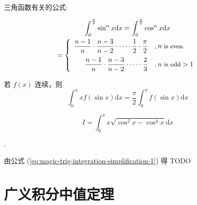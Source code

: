 三角函数有关的公式:
\begin{lemma}[点火公式]
    \begin{multline}\label{eq:launching-formula}
        \int_0^{\frac{\pi}{2}} \sin ^n x \mathrm{d} x = \int_0^{\frac{\pi}{2}} \cos ^n x \mathrm{d} x \\
        = 
        \left\{ 
            \begin{array}{rl}
                \dfrac{n - 1}{n} \cdot \dfrac{n - 3}{n - 2} \cdot \cdots \cdot \dfrac{1}{2} \cdot \dfrac{\pi}{2} &, n \mbox{\small \ is even.}   \\[1em]
                \dfrac{n - 1}{n} \cdot \dfrac{n - 3}{n - 2} \cdot \cdots \cdot \dfrac{2}{3}                      &, n \mbox{\small \ is odd} > 1 \\
            \end{array}
        \right.
    \end{multline}
    
    若 $f(x)$ 连续，则
    \begin{equation}
        \label{eq:magic-trig-integration-simplification-1}
        \int_0^{\pi} x f(\sin x) \mathrm{d} x = \dfrac{\pi}{2} \int_0^{\pi} f(\sin x) \mathrm{d} x
    \end{equation}
\end{lemma}

\begin{example}
    \[
        I = \int_0^{\pi} x \sqrt{\cos^2 x - \cos^4 x} \mathrm dx
    \]

    \cite[question 187]{w660}.

    由公式 (\ref{eq:magic-trig-integration-simplification-1}) 得
    TODO %
\end{example}

\section{广义积分中值定理} 

